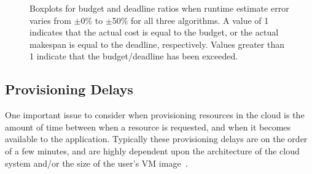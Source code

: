 \documentclass[conference]{IEEEtran}
\begin{document}
\begin{figure}[tb]
    \caption[Boxplots for budget and deadline ratios when runtime estimates are inaccurate]{Boxplots for budget and deadline ratios when runtime estimate error varies from $\pm$0\% to $\pm$50\% for all three algorithms. A value of 1 indicates that the actual cost is equal to the budget, or the actual makespan is equal to the deadline, respectively. Values greater than 1 indicate that the budget/deadline has been exceeded.}
    \label{fig:variances}
\end{figure}


\subsection{Provisioning Delays}
\label{sec:delays}

One important issue to consider when provisioning resources in the cloud is the amount of time between when a resource is requested, and when it becomes available to the application. Typically these provisioning delays are on the order of a few minutes, and are highly dependent upon the architecture of the cloud system and/or the size of the user's VM image~\cite{Nurmi2008b}.
\end{document}
